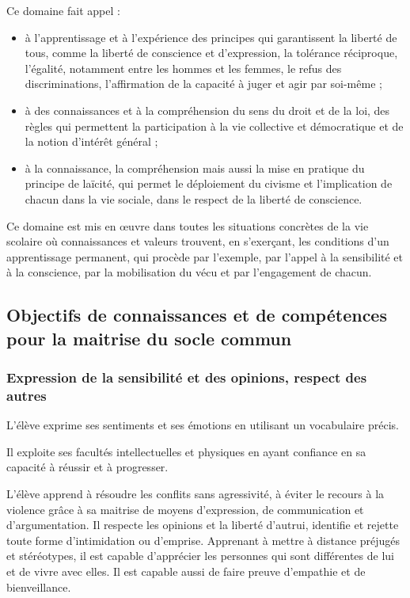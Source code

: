 Ce domaine fait appel :
\begin{itemize}
\item à l’apprentissage et à l’expérience des principes qui garantissent la liberté de tous, comme la liberté de conscience et d’expression, la tolérance réciproque, l’égalité, notamment entre les hommes et les femmes, le refus des discriminations, l’affirmation de la capacité à juger et agir par soi-même ;
\item à des connaissances et à la compréhension du sens du droit et de la loi, des règles qui permettent la participation à la vie collective et démocratique et de la notion d’intérêt général ;
\item à la connaissance, la compréhension mais aussi la mise en pratique du principe de laïcité, qui permet le déploiement du civisme et l’implication de chacun dans la vie sociale, dans le respect de la liberté de conscience.
\end{itemize}

Ce domaine est mis en œuvre dans toutes les situations concrètes de la vie scolaire où connaissances et valeurs trouvent, en s’exerçant, les conditions d’un apprentissage permanent, qui procède par l’exemple, par l’appel à la sensibilité et à la conscience, par la mobilisation du vécu et par l’engagement de chacun.
 
\subsection{Objectifs de connaissances et de compétences pour la maitrise du socle commun}
\subsubsection{Expression de la sensibilité et des opinions, respect des autres}
L’élève exprime ses sentiments et ses émotions en utilisant un vocabulaire précis.

Il exploite ses facultés intellectuelles et physiques en ayant confiance en sa capacité à réussir et à progresser.

L’élève apprend à résoudre les conflits sans agressivité, à éviter le recours à la violence grâce à sa maitrise de moyens d’expression, de communication et d’argumentation. Il respecte les opinions et la liberté d’autrui, identifie et rejette toute forme d’intimidation ou d’emprise.  Apprenant à mettre à distance préjugés et stéréotypes, il est capable d’apprécier les personnes qui sont différentes de lui et de vivre avec elles. Il est capable aussi de faire preuve d’empathie et de bienveillance.


